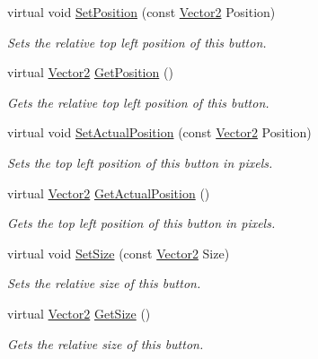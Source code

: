 \begin{DoxyCompactItemize}
virtual void \hyperlink{classphys_1_1UI_1_1TextButton_acf40fd3a8382cdfc959d078e99f6ff0b}{SetPosition} (const \hyperlink{classphys_1_1Vector2}{Vector2} Position)
\begin{DoxyCompactList}\small\item\em Sets the relative top left position of this button. \item\end{DoxyCompactList}\item 
virtual \hyperlink{classphys_1_1Vector2}{Vector2} \hyperlink{classphys_1_1UI_1_1TextButton_a09768e0666a109b7d35fd8b78240cfd3}{GetPosition} ()
\begin{DoxyCompactList}\small\item\em Gets the relative top left position of this button. \item\end{DoxyCompactList}\item 
virtual void \hyperlink{classphys_1_1UI_1_1TextButton_a717a2a7fdcf625e833764381989c4b56}{SetActualPosition} (const \hyperlink{classphys_1_1Vector2}{Vector2} Position)
\begin{DoxyCompactList}\small\item\em Sets the top left position of this button in pixels. \item\end{DoxyCompactList}\item 
virtual \hyperlink{classphys_1_1Vector2}{Vector2} \hyperlink{classphys_1_1UI_1_1TextButton_ab406bec58bf6244c3e867fefd19d4d7f}{GetActualPosition} ()
\begin{DoxyCompactList}\small\item\em Gets the top left position of this button in pixels. \item\end{DoxyCompactList}\item 
virtual void \hyperlink{classphys_1_1UI_1_1TextButton_a7ed2a635d23906fcf1844e75018e20de}{SetSize} (const \hyperlink{classphys_1_1Vector2}{Vector2} Size)
\begin{DoxyCompactList}\small\item\em Sets the relative size of this button. \item\end{DoxyCompactList}\item 
virtual \hyperlink{classphys_1_1Vector2}{Vector2} \hyperlink{classphys_1_1UI_1_1TextButton_a21f1ff24070711e5a42eae4eb54d02d6}{GetSize} ()
\begin{DoxyCompactList}\small\item\em Gets the relative size of this button. \item\end{DoxyCompactList}\item 

\end{DoxyCompactItemize}
